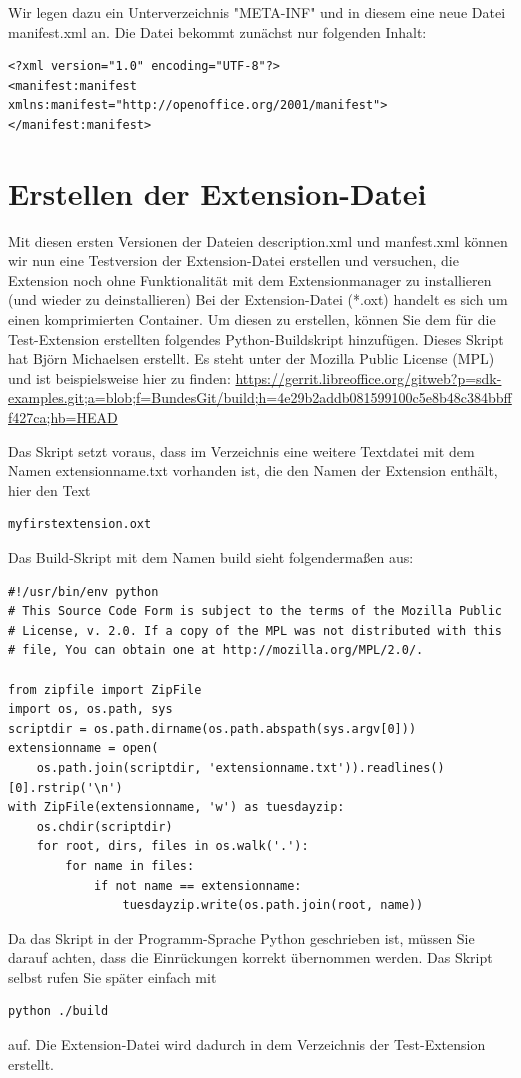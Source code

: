 \documentclass[a4paper,10pt,pagesize,titlepage]{scrbook}
\begin{document}
Wir legen dazu ein Unterverzeichnis "META-INF" und in diesem eine neue Datei manifest.xml an. Die Datei bekommt zunächst nur folgenden Inhalt:
\begin{lstlisting}
<?xml version="1.0" encoding="UTF-8"?>
<manifest:manifest xmlns:manifest="http://openoffice.org/2001/manifest">
</manifest:manifest>
\end{lstlisting}



\section{Erstellen der Extension-Datei}

Mit diesen ersten Versionen der Dateien description.xml und manfest.xml können wir nun eine Testversion der Extension-Datei erstellen und versuchen, die Extension noch ohne Funktionalität mit dem Extensionmanager zu installieren (und wieder zu deinstallieren)
Bei der Extension-Datei (*.oxt) handelt es sich um einen komprimierten Container. Um diesen zu erstellen, können Sie dem für die Test-Extension erstellten folgendes Python-Buildskript hinzufügen. Dieses Skript hat Björn Michaelsen erstellt. Es steht unter der Mozilla Public License (MPL) und ist beispielsweise hier zu finden: \url{https://gerrit.libreoffice.org/gitweb?p=sdk-examples.git;a=blob;f=BundesGit/build;h=4e29b2addb081599100c5e8b48c384bbfff427ca;hb=HEAD}

Das Skript setzt voraus, dass im Verzeichnis eine weitere Textdatei mit dem Namen extensionname.txt vorhanden ist, die den Namen der Extension enthält, hier den Text
\begin{lstlisting}
myfirstextension.oxt
\end{lstlisting}
Das Build-Skript mit dem Namen build sieht folgendermaßen aus:
\begin{lstlisting}
#!/usr/bin/env python
# This Source Code Form is subject to the terms of the Mozilla Public
# License, v. 2.0. If a copy of the MPL was not distributed with this
# file, You can obtain one at http://mozilla.org/MPL/2.0/.

from zipfile import ZipFile
import os, os.path, sys
scriptdir = os.path.dirname(os.path.abspath(sys.argv[0]))
extensionname = open(
    os.path.join(scriptdir, 'extensionname.txt')).readlines()[0].rstrip('\n')
with ZipFile(extensionname, 'w') as tuesdayzip:
    os.chdir(scriptdir)
    for root, dirs, files in os.walk('.'):
        for name in files:
            if not name == extensionname:
                tuesdayzip.write(os.path.join(root, name)) 
\end{lstlisting}
Da das Skript in der Programm-Sprache Python geschrieben ist, müssen Sie darauf achten, dass die Einrückungen korrekt übernommen werden. Das Skript selbst rufen Sie später einfach mit
\begin{lstlisting}
python ./build
\end{lstlisting}
auf. Die Extension-Datei wird dadurch in dem Verzeichnis der Test-Extension erstellt.
\end{document}
